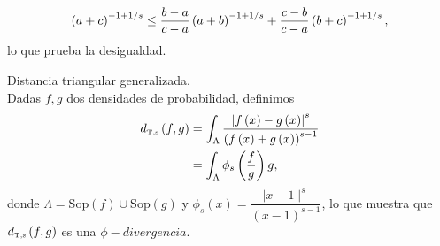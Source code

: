\begin{dem}
\begin{enumerate}[i)]
		\begin{align*}
		\left( a+c \right)^{-1+1/s} \le \frac{b-a}{c-a} \left( a+b \right)^{-1+1/s}
		+ \frac{c-b}{c-a} \left( b+c \right)^{-1+1/s},
		\end{align*}
		lo que prueba la desigualdad.
	\end{enumerate}
\end{dem}

\begin{definition} Distancia triangular generalizada.\\
	\label{TriangularGeneralizada}
	Dadas $f,g$ dos densidades de probabilidad, definimos
	\begin{align}
	\nonumber \label{FiDT}d_{\text{\tiny{T},s}}\left( f,g \right) &= \displaystyle \int_{\Lambda} \dfrac{\left| f\left( x \right) - g\left( x \right) \right|^s}{\left( f\left( x \right) + g\left( x \right) \right)^{s-1}} \\
	&= \displaystyle \int_{\Lambda} \phi_s\left(\frac{f}{g}\right) g,
	\end{align}
	donde $\Lambda=\mathrm{Sop}(f) \cup \mathrm{Sop}(g)$ y $\phi_s(x)=\dfrac{\mid x-1\mid^s}{(x-1)^{s-1}}$,  lo que muestra que $d_{\text{\tiny{T},s}}\left( f,g \right)$ es una $\phi-divergencia$.
\end{definition}

